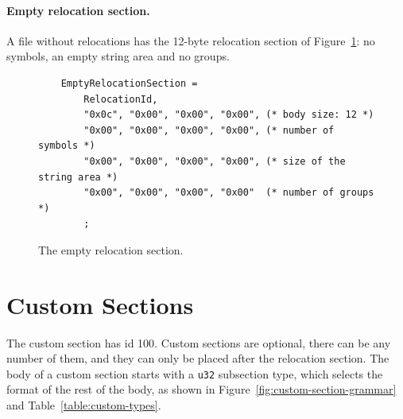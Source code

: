 \documentclass{article}
\begin{document}
\paragraph{Empty relocation section.}
A file without relocations has the 12-byte relocation section of Figure~\ref{fig:empty-relocation-section}: no symbols, an empty string area and no groups.

\begin{figure}[H]
\begin{verbatim}
    EmptyRelocationSection =
        RelocationId,
        "0x0c", "0x00", "0x00", "0x00", (* body size: 12 *)
        "0x00", "0x00", "0x00", "0x00", (* number of symbols *)
        "0x00", "0x00", "0x00", "0x00", (* size of the string area *)
        "0x00", "0x00", "0x00", "0x00"  (* number of groups *)
        ;
\end{verbatim}
\caption{The empty relocation section.}
\label{fig:empty-relocation-section}
\end{figure}

\section{Custom Sections}
\label{sec:custom}
The custom section has id 100.
Custom sections are optional, there can be any number of them, and they can only be placed after the relocation section.
The body of a custom section starts with a \verb|u32| subsection type, which selects the format of the rest of the body, as shown in Figure~\ref{fig:custom-section-grammar} and Table~\ref{table:custom-types}.
\end{document}
